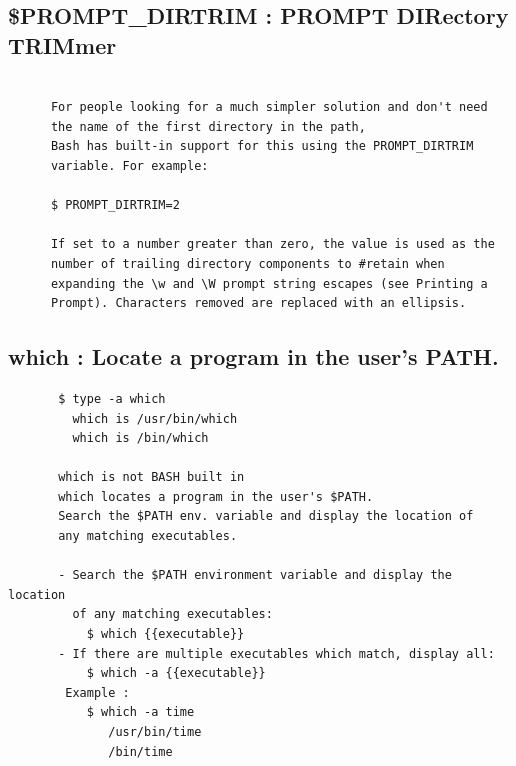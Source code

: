 \documentclass[a4paper,12pt]{article}
\begin{document}
\subsection{\$PROMPT\_DIRTRIM   : PROMPT DIRectory TRIMmer }
\begin{verbatim}

      For people looking for a much simpler solution and don't need           
      the name of the first directory in the path, 
      Bash has built-in support for this using the PROMPT_DIRTRIM 
      variable. For example:

      $ PROMPT_DIRTRIM=2

      If set to a number greater than zero, the value is used as the   
      number of trailing directory components to #retain when 
      expanding the \w and \W prompt string escapes (see Printing a 
      Prompt). Characters removed are replaced with an ellipsis.

\end{verbatim}

\subsection{which     : Locate a program in the user's PATH.}
\begin{verbatim}
       $ type -a which
         which is /usr/bin/which
         which is /bin/which
      
       which is not BASH built in
       which locates a program in the user's $PATH.
       Search the $PATH env. variable and display the location of 
       any matching executables.
       
       - Search the $PATH environment variable and display the location 
         of any matching executables:
           $ which {{executable}}
       - If there are multiple executables which match, display all:
           $ which -a {{executable}}
        Example : 
           $ which -a time
              /usr/bin/time
              /bin/time
\end{verbatim}
\end{document}
